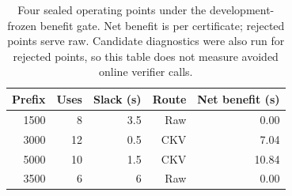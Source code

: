\begin{table}[t]
\centering\small
\caption{Four sealed operating points under the development-frozen benefit gate. Net benefit is per certificate; rejected points serve raw. Candidate diagnostics were also run for rejected points, so this table does not measure avoided online verifier calls.}
\label{tab:gate}
\begin{tabular}{@{}rrrrr@{}}
\toprule
Prefix & Uses & Slack (s) & Route & Net benefit (s)\\
\midrule
1500 & 8 & 3.5 & Raw & 0.00\\
3000 & 12 & 0.5 & CKV & 7.04\\
5000 & 10 & 1.5 & CKV & 10.84\\
3500 & 6 & 6 & Raw & 0.00\\
\bottomrule
\end{tabular}
\end{table}
